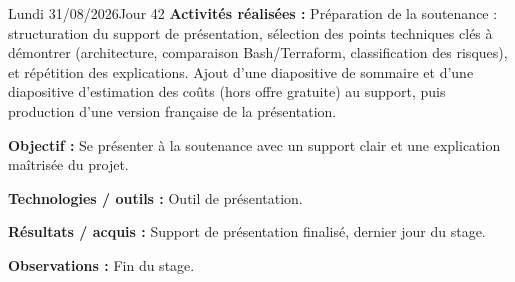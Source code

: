 \documentclass[11pt,a4paper]{article}
\newcommand{\journalfield}[2]{{\color{primaryblue}\textbf{#1 :}} #2\par\smallskip}
\begin{document}
\begin{journalday}{Lundi 31/08/2026}{Jour 42}
\journalfield{Activités réalisées}{Préparation de la soutenance : structuration du support de présentation, sélection des points techniques clés à démontrer (architecture, comparaison Bash/Terraform, classification des risques), et répétition des explications. Ajout d'une diapositive de sommaire et d'une diapositive d'estimation des coûts (hors offre gratuite) au support, puis production d'une version française de la présentation.}
\journalfield{Objectif}{Se présenter à la soutenance avec un support clair et une explication maîtrisée du projet.}
\journalfield{Technologies / outils}{Outil de présentation.}
\journalfield{Résultats / acquis}{Support de présentation finalisé, dernier jour du stage.}
\journalfield{Observations}{Fin du stage.}
\end{journalday}
\end{document}
